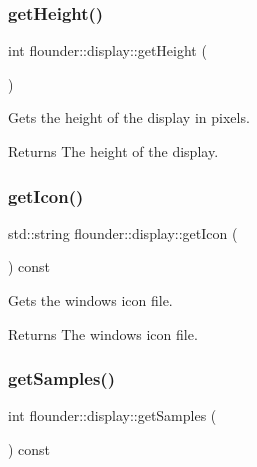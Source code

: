 \subsubsection{\texorpdfstring{get\+Height()}{getHeight()}}
{\footnotesize\ttfamily int flounder\+::display\+::get\+Height (\begin{DoxyParamCaption}{ }\end{DoxyParamCaption})\hspace{0.3cm}{\ttfamily [inline]}}



Gets the height of the display in pixels. 

\begin{DoxyReturn}{Returns}
The height of the display. 
\end{DoxyReturn}
\mbox{\label{classflounder_1_1display_a086f8409c29970e414754b4c2f871bba}} 
\subsubsection{\texorpdfstring{get\+Icon()}{getIcon()}}
{\footnotesize\ttfamily std\+::string flounder\+::display\+::get\+Icon (\begin{DoxyParamCaption}{ }\end{DoxyParamCaption}) const\hspace{0.3cm}{\ttfamily [inline]}}



Gets the window\textquotesingle{}s icon file. 

\begin{DoxyReturn}{Returns}
The window\textquotesingle{}s icon file. 
\end{DoxyReturn}
\mbox{\label{classflounder_1_1display_ad3fe2fe2d8610010e53ec11a272c537c}} 
\subsubsection{\texorpdfstring{get\+Samples()}{getSamples()}}
{\footnotesize\ttfamily int flounder\+::display\+::get\+Samples (\begin{DoxyParamCaption}{ }\end{DoxyParamCaption}) const\hspace{0.3cm}{\ttfamily [inline]}}




